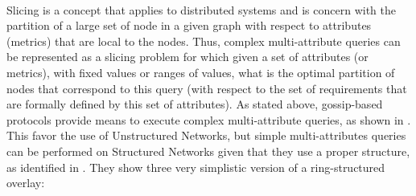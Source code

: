 \documentclass[11pt]{amsart}
\begin{document}
        \\ Slicing is a concept that applies to distributed systems and is concern with
        the partition of a large set of node in a given graph with respect to attributes
        (metrics) that are local to the nodes. Thus, complex multi-attribute queries can
        be represented as a slicing problem for which given a set of attributes (or
        metrics), with fixed values or ranges of values, what is the optimal partition of
        nodes that correspond to this query (with respect to the set of requirements that
        are formally defined by this set of attributes). As stated above, gossip-based
        protocols provide means to execute complex multi-attribute queries, as shown in
        \cite{pasquet2014autonomous}. This favor the use of Unstructured Networks, but
        simple multi-attributes queries can be performed on Structured Networks given that
        they use a proper structure, as identified in \cite{p2p_collab}. They show three
        very simplistic version of a ring-structured overlay:
\end{document}
